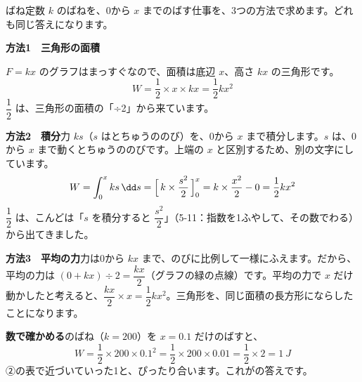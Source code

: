 
\label{bk:5-12:bane}ばね定数 $k$ のばねを、0から $x$ までのばす仕事を、3つの方法で求めます。どれも同じ答えになります。

\noindent\begin{minipage}[c]{0.44\linewidth}
\end{minipage}\hfill
\begin{minipage}[c]{0.54\linewidth}\raggedright
\textbf{方法1　三角形の面積}\par
$F=kx$ のグラフはまっすぐなので、面積は底辺 $x$、高さ $kx$ の三角形です。
\[ W=\frac{1}{2}\times x\times kx=\frac{1}{2}kx^2 \]
$\dfrac{1}{2}$ は、三角形の面積の「÷2」から来ています。
\end{minipage}

\noindent\textbf{方法2　積分}\quad 力 $ks$（$s$ はとちゅうののび）を、0から $x$ まで積分します。$s$ は、0から $x$ まで動くとちゅうののびです。上端の $x$ と区別するため、別の文字にしています。
\[ W=\int_0^x ks\,\dd s=\Bigl[\,k\times\frac{s^2}{2}\,\Bigr]_0^x=k\times\frac{x^2}{2}-0=\frac{1}{2}kx^2 \]
$\dfrac{1}{2}$ は、こんどは「$s$ を積分すると $\dfrac{s^2}{2}$」（5-11：指数を1ふやして、その数でわる）から出てきました。

\noindent\textbf{方法3　平均の力}\quad 力は0から $kx$ まで、のびに比例して一様にふえます。だから、平均の力は $(0+kx)\div2=\dfrac{kx}{2}$（グラフの緑の点線）です。平均の力で $x$ だけ動かしたと考えると、$\dfrac{kx}{2}\times x=\dfrac{1}{2}kx^2$。三角形を、同じ面積の長方形にならしたことになります。

\noindent\textbf{数で確かめる}\quad \bkyattemiyouref のばね（$k=200$）を $x=0.1$ だけのばすと、
\[ W=\frac{1}{2}\times200\times0.1^2=\frac{1}{2}\times200\times0.01=\frac{1}{2}\times2=\qty{1}{J} \]
②の表で近づいていった1と、ぴったり合います。これが\bkhatenaref の答えです。

